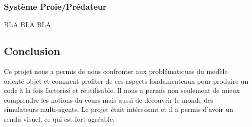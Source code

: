 \documentclass [a4paper,11pt,titlepage] {article}
\begin{document}
\subsubsection {Système Proie/Prédateur}
BLA BLA BLA

\begin{center}
\section* {Conclusion }
\end{center}

Ce projet nous a permis de nous confronter aux problématiques du modèle orienté objet et comment profiter de ces aspects fondamenteaux pour produire un code à la fois factorisé et réutilisable. Il nous a permis non seulement de mieux comprendre les notions du cours
mais aussi de découvrir le monde des simulateurs multi-agents. Le
projet était intéressant et il a permis d’avoir un rendu visuel, ce qui est fort agréable.
\end{document}
